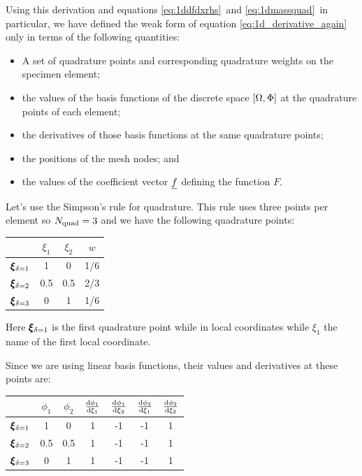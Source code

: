 \documentclass[a4paper, 11pt]{book}
\begin{document}
Using this derivation and equations \eqref{eq:1ddfdxrhs}\ and
\eqref{eq:1dmassquad}\ in particular, we have defined the weak form of
equation \eqref{eq:1d_derivative_again} only in terms of the following quantities:
\begin{itemize}
\item A set of quadrature points and corresponding quadrature weights on the
  specimen element;
\item the values of the
basis functions of the discrete space $[\Omega,\Phi]$ at the quadrature points
of each element;
\item the derivatives of those basis functions at the same quadrature
  points;
\item the positions of the mesh nodes; and
\item the values of the coefficient vector $\underline{f}$ defining the function $F$.
\end{itemize}

Let's use the Simpson's rule for quadrature. This rule uses three points per
element so $N_\mathrm{quad}=3$ and we have the following quadrature points:

\begin{center}
\begin{tabular}{c|ccc}
  &$\xi_1$&$\xi_2$&$w$\\\hline
  $\pmb{\xi}_{\delta=1}$ & 1 & 0 & 1/6\\
  $\pmb{\xi}_{\delta=2}$ & 0.5 & 0.5 & 2/3\\
  $\pmb{\xi}_{\delta=3}$ & 0 & 1 & 1/6\\\hline
\end{tabular}
\end{center}

Here $\pmb{\xi}_{\delta=1}$ is the first quadrature point while in local
coordinates while $\xi_1$ the name of the first local coordinate.

Since we are using linear basis functions, their values and derivatives at
these points are:
\begin{center}
\begin{tabular}{c|cccccc}
  & $\phi_1$ & $\phi_2$ & $\frac{\mathrm{d}\phi_1}{\mathrm{d}\xi_1}$ & $\frac{\mathrm{d}\phi_1}{\mathrm{d}\xi_2}$ & $\frac{\mathrm{d}\phi_2}{\mathrm{d}\xi_1}$ & $\frac{\mathrm{d}\phi_2}{\mathrm{d}\xi_2}$ \\\hline
  $\pmb{\xi}_{\delta=1}$ & 1 & 0 & 1 & -1 & -1 & 1 \\
  $\pmb{\xi}_{\delta=2}$ & 0.5 & 0.5 & 1 & -1 & -1 & 1 \\
  $\pmb{\xi}_{\delta=3}$ & 0 & 1 & 1 & -1 & -1 & 1 \\\hline
\end{tabular}
\end{center}
\end{document}
